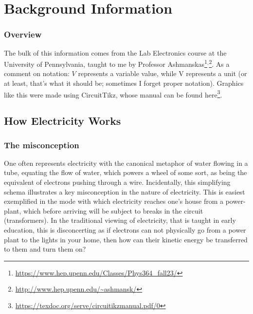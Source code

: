 \chapter{Background Information} 

\subsection{Overview} 
The bulk of this information comes from the Lab Electronics course at the University of Pennsylvania, taught to me by Professor Ashmanskas\footnote{\url{https://www.hep.upenn.edu/Classes/Phys364_fall23/}}$^,$\footnote{\url{http://www.hep.upenn.edu/~ashmansk/}}. As a comment on notation: $V$ represents a variable value, while V represents a unit (or at least, that's what it should be; sometimes I forget proper notation). Graphics like this were made using CircuitTikz, whose manual can be found here\footnote{\url{https://texdoc.org/serve/circuitikzmanual.pdf/0}}.\newline

\section{How Electricity Works} 

\label{sec:HowElectricityWorks}

\subsection{The misconception} One often represents electricity with the canonical metaphor of water flowing in a tube, equating the flow of water, which powers a wheel of some sort, as being the equivalent of electrons pushing through a wire. Incidentally, this simplifying schema illustrates a key misconception in the nature of electricity. This is easiest exemplified in the mode with which electricity reaches one's house from a power-plant, which before arriving will be subject to breaks in the circuit (transformers). In the traditional viewing of electricity, that is taught in early education, this is disconcerting as if electrons can not physically go from a power plant to the lights in your home, then how can their kinetic energy be transferred to them and turn them on?\newline

